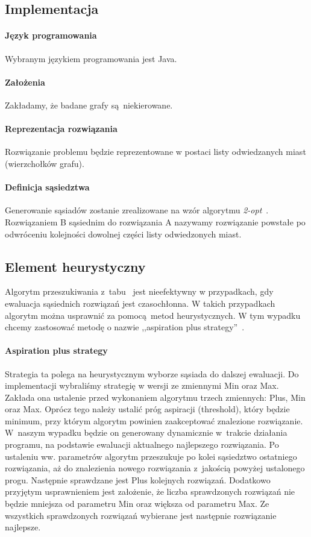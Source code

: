 \documentclass[11pt,a4paper]{article}
\begin{document}
\subsection{Implementacja}
\paragraph{Język programowania} Wybranym językiem programowania jest Java.
\paragraph{Założenia} Zakładamy, że badane grafy są niekierowane.
\paragraph{Reprezentacja rozwiązania} Rozwiązanie problemu będzie reprezentowane w postaci listy odwiedzanych miast (wierzchołków grafu).
\paragraph{Definicja sąsiedztwa} Generowanie sąsiadów zostanie zrealizowane na wzór algorytmu \textit{2-opt}~\cite{2opt}. Rozwiązaniem B sąsiednim do rozwiązania A nazywamy rozwiązanie powstałe po odwróceniu kolejności dowolnej części listy odwiedzonych miast.

\subsection{Element heurystyczny}
Algorytm przeszukiwania z~tabu~\cite{tabuSearch} jest nieefektywny w przypadkach, gdy ewaluacja sąsiednich rozwiązań jest czasochłonna. W takich przypadkach algorytm można usprawnić za pomocą metod heurystycznych. W tym wypadku chcemy zastosować metodę o nazwie ,,aspiration plus strategy''~\cite{aspirationPlus}.
\paragraph{Aspiration plus strategy} Strategia ta polega na heurystycznym wyborze sąsiada do dalszej ewaluacji. Do implementacji wybraliśmy strategię w wersji ze zmiennymi Min oraz Max. Zakłada ona ustalenie przed wykonaniem algorytmu trzech zmiennych: Plus, Min oraz Max. Oprócz tego należy ustalić próg aspiracji (threshold), który będzie minimum, przy którym algorytm powinien zaakceptować znalezione rozwiązanie. W~naszym wypadku będzie on generowany dynamicznie w~trakcie działania programu, na podstawie ewaluacji aktualnego najlepszego rozwiązania. Po ustaleniu ww. parametrów algorytm przeszukuje po kolei sąsiedztwo ostatniego rozwiązania, aż do znalezienia nowego rozwiązania z~jakością powyżej ustalonego progu. Następnie sprawdzane jest Plus kolejnych rozwiązań. Dodatkowo przyjętym usprawnieniem jest założenie, że liczba sprawdzonych rozwiązań nie będzie mniejsza od parametru Min oraz większa od parametru Max. Ze wszystkich sprawdzonych rozwiązań wybierane jest następnie rozwiązanie najlepsze.
\end{document}
